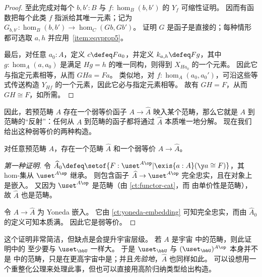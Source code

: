 \begin{proof}
  至此完成对每个 $b,b':B$ 与 $f:\hom_B(b,b')$ 的 $Y_f$ 可缩性证明。
  因而有函数把每个此类 $f$ 指派给其唯一元素；记为 $G_{b,b'}:\hom_B(b,b') \to \hom_C(Gb,Gb')$。
  证明 $G$ 是函子是直接的；每种情形都可选取 $a,h$ 并应用~\ref{item:eqvprop5}。

  最后，对任意 $a_0:A$，定义 $c\defeq Fa_0$，并定义 $k_{a,h}\defeq F g$，其中 $g:\hom_A(a,a_0)$ 是满足 $Hg = h$ 的唯一同构，则得到 $X_{Ha_0}$ 的一个元素。
  因此它与指定元素相等，从而 $GHa=Fa$。
  类似地，对 $f:\hom_A(a_0,a_0')$，可沿这些等式传送构造 $Y_{Hf}$ 的一个元素，因此它必与指定元素相等。
  故有 $GH=F$，从而 $GH\cong F$，如所需。
\end{proof}

%
因此，若预范畴 $A$ 存在一个弱等价函子 $A\to \widehat{A}$ 映入某个范畴，那么它就是 $A$ 到范畴的“反射”：任何从 $A$ 到范畴的函子都将通过 $\widehat{A}$ 本质唯一地分解。
现在我们给出这种弱等价的两种构造。

%
%

\begin{thm}\label{thm:rezk-completion}
  对任意预范畴 $A$，存在一个范畴 $\widehat A$ 和一个弱等价 $A\to\widehat{A}$。
\end{thm}

\begin{proof}[第一种证明]
  令 $\widehat{A}_0 \defeq \setof{ F:\uset^{A\op} | \exis{a:A} (\y a \cong F)}$，其 hom-集从 $\uset^{A\op}$ 继承。
  则包含函子 $\widehat{A} \to \uset^{A\op}$ 完全忠实，且在对象上是嵌入。
  又因为 $\uset^{A\op}$ 是范畴（由 \cref{ct:functor-cat}，而 \uset 由单价性是范畴），故 $\widehat A$ 也是范畴。

  令 $A\to\widehat A$ 为 Yoneda 嵌入。
  它由 \cref{ct:yoneda-embedding} 可知完全忠实，而由 $\widehat{A}_0$ 的定义可知本质满。
  因此它是弱等价。
\end{proof}

这个证明非常简洁，但缺点是会提升宇宙层级。
若 $A$ 是宇宙 \bbU 中的范畴，则此证明中的 \uset 至少要与 $\uset_\bbU$ 一样大。
于是 $\uset_\bbU$ 与 $(\uset_\bbU)^{A\op}$ 本身并不是 \bbU 中的范畴，只是在更高宇宙中是；并且\emph{先验地}，$\widehat A$ 也同样如此。
可以设想用一个重整化公理来处理此事，但也可以直接用高阶归纳类型给出构造。

